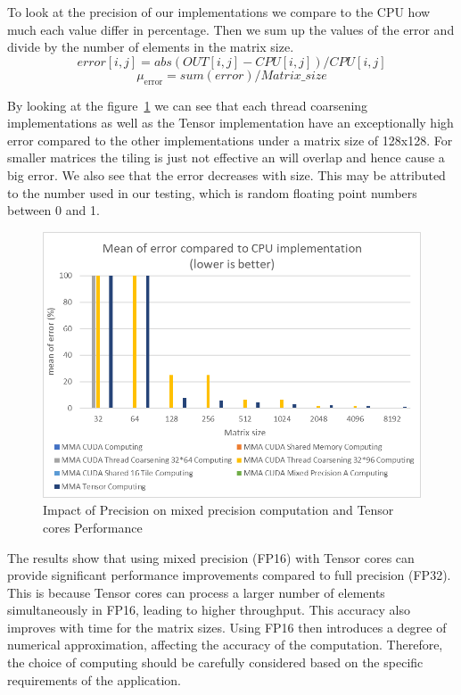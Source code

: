 \documentclass[conference]{IEEEtran}
\begin{document}
  To look at the precision of our implementations we compare to the CPU how much each value differ in percentage.
  Then we sum up the values of the error and divide by the number of elements in the matrix size.
  \[error[i,j] = abs(OUT[i,j] - CPU[i,j]) / CPU[i,j] \]
  \[\mu_{\mathrm{error}} = sum(error)/Matrix\_size\]

  By looking at the figure~\ref{fig:precision-impact} we can see that each thread coarsening implementations as well as the Tensor implementation
  have an exceptionally high error compared to the other implementations under a matrix size of 128x128.
  For smaller matrices the tiling is just not effective an will overlap and hence cause a big error. We also see that the error decreases with size.
  This may be attributed to the number used in our testing, which is random floating point numbers between 0 and 1. 
  \begin{figure}[htbp]
    \centering
    \includegraphics[scale=0.6]{figures/Mean of error compared to CPU 2.png}
    \caption{Impact of Precision on mixed precision computation and Tensor cores Performance}
    \label{fig:precision-impact}
  \end{figure}
  
  The results show that using mixed precision (FP16) with Tensor cores can provide significant performance improvements compared to full precision (FP32).
  This is because Tensor cores can process a larger number of elements simultaneously in FP16,
  leading to higher throughput. This accuracy also improves with time for the matrix sizes.
  Using FP16 then introduces a degree of numerical approximation, affecting the accuracy of the computation.
  Therefore, the choice of computing should be carefully considered based on the specific
  requirements of the application. 
  
\end{document}
